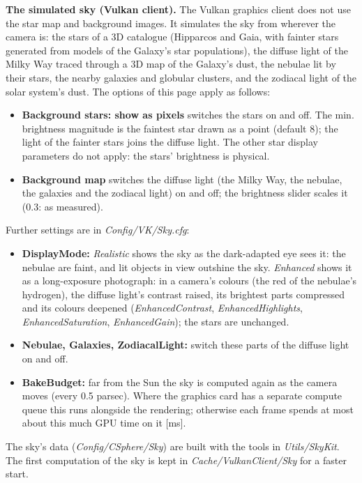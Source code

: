 \documentclass[Orbiter User Manual.tex]{subfiles}
\begin{document}
\noindent
\textbf{The simulated sky (Vulkan client).} The Vulkan graphics client does not use the star map and background images. It simulates the sky from wherever the camera is: the stars of a 3D catalogue (Hipparcos and Gaia, with fainter stars generated from models of the Galaxy's star populations), the diffuse light of the Milky Way traced through a 3D map of the Galaxy's dust, the nebulae lit by their stars, the nearby galaxies and globular clusters, and the zodiacal light of the solar system's dust. The options of this page apply as follows:
\begin{itemize}
\item \textbf{Background stars: show as pixels} switches the stars on and off. The min. brightness magnitude is the faintest star drawn as a point (default 8); the light of the fainter stars joins the diffuse light. The other star display parameters do not apply: the stars' brightness is physical.
\item \textbf{Background map} switches the diffuse light (the Milky Way, the nebulae, the galaxies and the zodiacal light) on and off; the brightness slider scales it (0.3: as measured).
\end{itemize}
Further settings are in \textit{Config/VK/Sky.cfg}:
\begin{itemize}
\item \textbf{DisplayMode:} \textit{Realistic} shows the sky as the dark-adapted eye sees it: the nebulae are faint, and lit objects in view outshine the sky. \textit{Enhanced} shows it as a long-exposure photograph: in a camera's colours (the red of the nebulae's hydrogen), the diffuse light's contrast raised, its brightest parts compressed and its colours deepened (\textit{EnhancedContrast}, \textit{EnhancedHighlights}, \textit{EnhancedSaturation}, \textit{EnhancedGain}); the stars are unchanged.
\item \textbf{Nebulae, Galaxies, ZodiacalLight:} switch these parts of the diffuse light on and off.
\item \textbf{BakeBudget:} far from the Sun the sky is computed again as the camera moves (every 0.5 parsec). Where the graphics card has a separate compute queue this runs alongside the rendering; otherwise each frame spends at most about this much GPU time on it [ms].
\end{itemize}
The sky's data (\textit{Config/CSphere/Sky}) are built with the tools in \textit{Utils/SkyKit}. The first computation of the sky is kept in \textit{Cache/VulkanClient/Sky} for a faster start.
\end{document}
